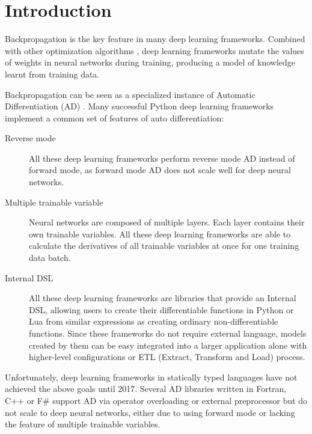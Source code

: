 
\section{Introduction}
\label{introduction}

Backpropagation \cite{rumelhart1985learning} is the key feature in many deep learning frameworks. Combined with other optimization algorithms \cite{kingma2014adam, zeiler2012adadelta,duchi2011adaptive}, deep learning frameworks mutate the values of weights in neural networks during training, producing a model of knowledge learnt from training data.

Backpropagation can be seen as a specialized instance of Automatic Differentiation (AD) \cite{baydin2015automatic}. Many successful Python deep learning frameworks \cite{tokui2015chainer,google2017eager,paszke2017pytorch,neubig2017dynet} implement a common set of features of auto differentiation:

\begin{description}

  \item[Reverse mode] All these deep learning frameworks perform reverse mode AD instead of forward mode, as forward mode AD does not scale well for deep neural networks.

  \item[Multiple trainable variable] Neural networks are composed of multiple layers. Each layer contains their own trainable variables. All these deep learning frameworks are able to calculate the derivatives of all trainable variables at once for one training data batch.

  \item[Internal DSL \cite{fowler2010domain}] All these deep learning frameworks are libraries that provide an Internal DSL, allowing users to create their differentiable functions in Python or Lua from similar expressions as creating ordinary non-differentiable functions. Since these frameworks do not require external language, models created by them can be easy integrated into a larger application alone with higher-level configurations \cite{chollet2015keras} or ETL (Extract, Transform and Load) process.

\end{description}

Unfortunately, deep learning frameworks in statically typed languages have not achieved the above goals until 2017.
Several AD libraries \cite{bischof1992adifor,griewank1996algorithm,TapenadeRef13,baydin2015diffsharp} written in Fortran, C++ or F\# support AD via operator overloading or external preprocessor but do not scale to deep neural networks, either due to using forward mode or lacking the feature of multiple trainable variables.


